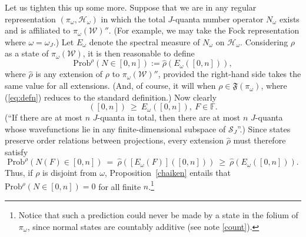 \documentclass[12pt]{article}
\theoremstyle{remark}
\theoremstyle{definition}
\newcommand{\fin}{\mathbb{F}}
\newcommand{\alg}[1]{\mathcal{#1}}
\newcommand{\hil}[1]{\mathcal{#1}}
\begin{document}
Let us tighten this up some more.  Suppose that we are in any regular representation $(\pi
_{\omega},\hil{H}_{\omega})$ in which the total $J$-quanta number operator
$N_{\omega}$ exists and is affiliated to $\pi
_{\omega}(\alg{W})''$.  (For example, we may take the Fock
representation where $\omega =\omega _{J}$.)  Let $E_{\omega}$ denote the
spectral measure of $N_{\omega}$ on
$\hil{H}_{\omega}$.  Considering $\rho$ as a
state of $\pi _{\omega }(\alg{W})$, it is then reasonable to define
\begin{equation} \label{eq:defn} 
\mathrm{Prob}^{\rho}(N\in [0,n]):=\hat{\rho}(E_{\omega}([0,n])),\end{equation} 
where $\hat{\rho}$ is any extension of $\rho$ 
to
$\pi _{\omega }(\alg{W})''$, provided the right-hand side takes the 
same value for all extensions.  (And, of course, it will when 
$\rho\in\mathfrak{F}(\pi _{\omega})$, where (\ref{eq:defn}) reduces to the standard 
definition.)  Now clearly
\begin{equation}
[E_{\omega}(F)]([0,n]) \: \geq \: E_{\omega}([0,n]) ,\ F\in\fin.\end{equation}
(``If there are at most $n$ $J$-quanta in total, then there are at 
most $n$ $J$-quanta whose wavefunctions lie in any finite-dimensional 
subspace of $\hil{S}_{J}$''.)
Since states preserve order relations between projections, every 
extension $\hat{\rho}$ must therefore satisfy 
\begin{equation}
\mathrm{Prob}^{\rho}(N(F)\in [0,n]) \:=\:\hat{\rho}([E_{\omega}(F)]([0,n]))
\: \geq \: \hat{\rho}(E_{\omega}([0,n])) .\end{equation}
Thus, if $\rho$ is disjoint from $\omega$, Proposition~\ref{chaiken} entails that
$\mathrm{Prob}^{\rho}(N\in [0,n])=0$ for all finite $n$.\footnote{Notice that such a prediction could never be made by a state in the 
folium of $\pi
_{\omega}$, since normal states are countably additive (see note 
\ref{count}).}  
\end{document}
